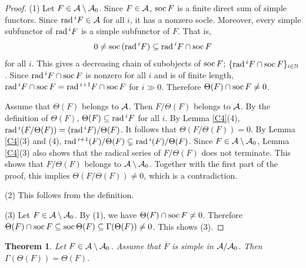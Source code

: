 \documentclass[11pt]{amsart}
\newtheorem{theorem}{Theorem}[section]
\theoremstyle{definition}
\numberwithin{equation}{section}
\begin{document}
\begin{proof}
(1) Let $F \in \AA\setminus \AA_0$. 
Since $F \in \AA$, $\soc F$ is a finite direct sum of simple functors. 
Since $\rad^i F \in \AA$ for all $i$, it has a nonzero socle. 
Moreover, every simple subfunctor of $\rad^i F$ is a simple subfunctor of $F$. 
That is, 
$$
0 \neq \soc (\rad ^i F) \subseteq \rad ^i F \cap \soc F 
$$
for all $i$. 
This gives a decreasing chain of subobjects of $\soc F$; $\{ \rad ^i F \cap \soc F \} _{i \in \mathbb{N}}$. 
Since $\rad ^i F \cap \soc F$ is nonzero for all $i$ and is of finite length, $\rad ^i F \cap \soc F = \rad ^{i+1} F \cap \soc F$ for $i \gg 0$. 
Therefore $\Theta (F) \cap \soc F \neq 0$.

 
Assume that $\Theta(F)$ belongs to $\AA$. 
Then $F/\Theta(F)$ belongs to $\AA$. 
By the definition of $\Theta(F)$, $\Theta(F) \subseteq \rad^i F$ for all $i$. 
By Lemma \ref{C4}(4), $\rad ^i (F/ \Theta (F)) = (\rad^i F)/ \Theta (F)$. 
It follows that $\Theta(F/\Theta(F))=0$. 
By Lemma \ref{C4}(3) and (4), $\rad^{i+1}(F)/\Theta(F) \subsetneq \rad^{i}(F)/\Theta(F)$. 
Since $F \in \AA\setminus \AA_0$, Lemma \ref{C4}(3) also shows that the radical series of $F/\Theta(F)$ does not terminate. 
This shows that $F/\Theta(F)$ belongs to $\AA \setminus \AA_0$. 
Together with the first part of the proof, this implies $\Theta(F/\Theta(F))\neq 0$, which is a contradiction. 

(2) This follows from the definition. 

(3) Let $F\in \AA\setminus \AA_0$. 
By (1), we have $\Theta(F)\cap \soc F \neq 0$. 
Therefore $\Theta(F)\cap \soc F \subseteq \soc \Theta(F) \subseteq \Gamma(\Theta(F))\neq 0$. 
This shows (3).     
\end{proof}




\begin{theorem}\label{C7}
Let $F \in \AA \setminus \AA_0$. 
Assume that $\overline{F}$ is simple in $\AA /\AA_0$. 
Then $\Gamma (\Theta (F)) = \Theta (F)$.  
\end{theorem}
\end{document}
